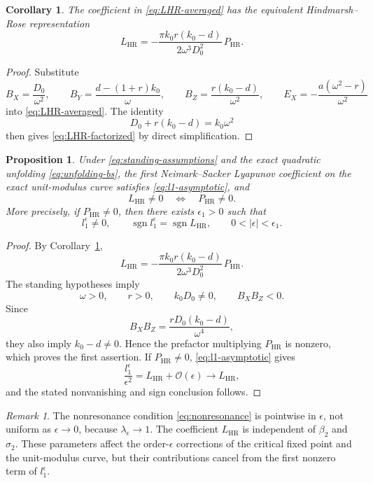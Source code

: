 \documentclass[11pt]{amsart}
\newtheorem{proposition}[theorem]{Proposition}
\newtheorem{corollary}[theorem]{Corollary}
\theoremstyle{remark}
\newtheorem{remark}[theorem]{Remark}
\newcommand{\cO}{\mathcal{O}}
\newcommand{\PHR}{P_{\mathrm{HR}}}
\newcommand{\LHR}{L_{\mathrm{HR}}}
\begin{document}
\begin{corollary}\label{cor:LHR-factorization}
The coefficient in \eqref{eq:LHR-averaged} has the equivalent
Hindmarsh--Rose representation
\begin{equation}\label{eq:LHR-factorized}
 \LHR=-\frac{\pi k_0r(k_0-d)}{2\omega^3D_0^2}\,\PHR.
\end{equation}
\end{corollary}

\begin{proof}
Substitute
\[
B_X=\frac{D_0}{\omega^2},\qquad
B_Y=\frac{d-(1+r)k_0}{\omega},\qquad
B_Z=\frac{r(k_0-d)}{\omega^2},\qquad
E_X=-\frac{a(\omega^2-r)}{\omega^2}
\]
into \eqref{eq:LHR-averaged}.  The identity
\[
 D_0+r(k_0-d)=k_0\omega^2
\]
then gives \eqref{eq:LHR-factorized} by direct simplification.
\end{proof}

\begin{proposition}\label{prop:l1-nondegenerate}
Under \eqref{eq:standing-assumptions} and the exact quadratic unfolding
\eqref{eq:unfolding-bs}, the first Neimark--Sacker Lyapunov coefficient on
the exact unit-modulus curve satisfies \eqref{eq:l1-asymptotic}, and
\[
 \LHR\ne0\quad\Longleftrightarrow\quad\PHR\ne0.
\]
More precisely, if \(\PHR\ne0\), then there exists \(\epsilon_1>0\) such that
\[
 l_1^\epsilon\ne0,\qquad
 \operatorname{sgn}l_1^\epsilon=\operatorname{sgn}\LHR,
 \qquad 0<|\epsilon|<\epsilon_1.
\]
\end{proposition}

\begin{proof}
By Corollary~\ref{cor:LHR-factorization},
\[
 \LHR=-\frac{\pi k_0r(k_0-d)}{2\omega^3D_0^2}\,\PHR.
\]
The standing hypotheses imply
\[
 \omega>0,\qquad r>0,\qquad k_0D_0\ne0,\qquad B_XB_Z<0.
\]
Since
\[
 B_XB_Z=\frac{rD_0(k_0-d)}{\omega^4},
\]
they also imply \(k_0-d\ne0\).  Hence the prefactor multiplying \(\PHR\) is
nonzero, which proves the first assertion.  If \(\PHR\ne0\),
\eqref{eq:l1-asymptotic} gives
\[
 \frac{l_1^\epsilon}{\epsilon^2}
=\LHR+\cO(\epsilon)\longrightarrow\LHR,
\]
and the stated nonvanishing and sign conclusion follows.
\end{proof}

\begin{remark}\label{rem:nonresonance-parameters}
The nonresonance condition \eqref{eq:nonresonance} is pointwise in
\(\epsilon\), not uniform as \(\epsilon\to0\), because
\(\lambda_\epsilon\to1\).  The coefficient \(\LHR\) is independent of
\(\beta_2\) and \(\sigma_2\).  These parameters affect the order-\(\epsilon\)
corrections of the critical fixed point and the unit-modulus curve, but their
contributions cancel from the first nonzero term of \(l_1^\epsilon\).
\end{remark}
\end{document}
